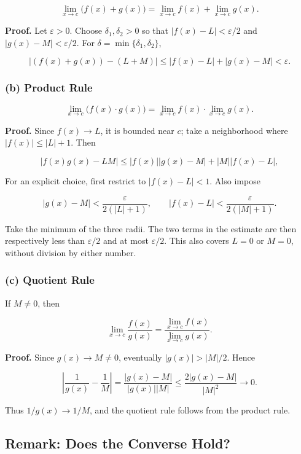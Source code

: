 \documentclass[11pt,a4paper]{article}
\begin{document}
\[
\lim_{x\to c}\bigl(f(x)+g(x)\bigr)
=\lim_{x\to c}f(x)+\lim_{x\to c}g(x).
\]

\textbf{Proof.} Let \(\varepsilon>0\). Choose \(\delta_1,\delta_2>0\) so
that \(|f(x)-L|<\varepsilon/2\) and \(|g(x)-M|<\varepsilon/2\). For
\(\delta=\min\{\delta_1,\delta_2\}\),

\[
|(f(x)+g(x))-(L+M)|\le |f(x)-L|+|g(x)-M|<\varepsilon.
\]

\subsubsection{(b) Product Rule}\label{b-product-rule}

\[
\lim_{x\to c}\bigl(f(x)\cdot g(x)\bigr)
=\lim_{x\to c}f(x)\cdot\lim_{x\to c}g(x).
\]

\textbf{Proof.} Since \(f(x)\to L\), it is bounded near \(c\); take a
neighborhood where \(|f(x)|\le |L|+1\). Then

\[
|f(x)g(x)-LM|\le |f(x)||g(x)-M|+|M||f(x)-L|,
\]

For an explicit choice, first restrict to \(|f(x)-L|<1\). Also impose

\[
|g(x)-M|<\frac{\varepsilon}{2(|L|+1)},
\qquad |f(x)-L|<\frac{\varepsilon}{2(|M|+1)}.
\]

Take the minimum of the three radii. The two terms in the estimate are
then respectively less than \(\varepsilon/2\) and at most
\(\varepsilon/2\). This also covers \(L=0\) or \(M=0\), without division
by either number.

\subsubsection{(c) Quotient Rule}\label{c-quotient-rule}

If \(M\ne0\), then

\[
\lim_{x\to c}\frac{f(x)}{g(x)}
=\frac{\displaystyle\lim_{x\to c}f(x)}
{\displaystyle\lim_{x\to c}g(x)}.
\]

\textbf{Proof.} Since \(g(x)\to M\ne0\), eventually \(|g(x)|>|M|/2\).
Hence

\[
\left|\frac1{g(x)}-\frac1M\right|
=\frac{|g(x)-M|}{|g(x)||M|}
\le \frac{2|g(x)-M|}{|M|^2}\to0.
\]

Thus \(1/g(x)\to1/M\), and the quotient rule follows from the product
rule.

\subsection{Remark: Does the Converse
Hold?}\label{remark-does-the-converse-hold}
\end{document}
